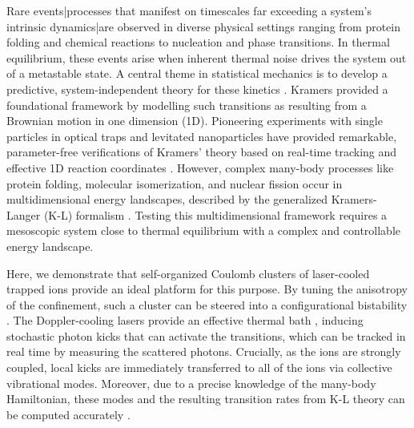 \documentclass[aps,prl,twocolumn,superscriptaddress,showpacs,floatfix]{revtex4-2}
\begin{document}
\maketitle

Rare events|processes that manifest on timescales far exceeding a system's intrinsic dynamics|are observed in diverse physical settings ranging from protein folding and chemical reactions to nucleation and phase transitions. In thermal equilibrium, these events arise when inherent thermal noise drives the system out of a metastable state. A central theme in statistical mechanics is to develop a predictive, system-independent theory for these kinetics \cite{Peters2017}. Kramers provided a foundational framework \cite{Kramers1940, Kramers_review_hanggi} by modelling such transitions as resulting from a Brownian motion in one dimension (1D). Pioneering experiments with single particles in optical traps \cite{McCann1999} and levitated nanoparticles \cite{Rondin2017} have provided remarkable, parameter-free verifications of Kramers' theory based on real-time tracking \cite{Li2010} and effective 1D reaction coordinates \cite{Berezhkovskii2005, Zijlstra2020}. However, complex many-body processes like protein folding, molecular isomerization, and nuclear fission occur in multidimensional energy landscapes, described by the generalized Kramers-Langer (K-L) formalism \cite{Langer1969}. Testing this multidimensional framework requires a mesoscopic system close to thermal equilibrium with a complex and controllable energy landscape.

Here, we demonstrate that self-organized Coulomb clusters of laser-cooled trapped ions provide an ideal platform for this purpose. By tuning the anisotropy of the confinement, such a cluster can be steered into a configurational bistability \cite{ayyadevara2025, mizukami2025}. The Doppler-cooling lasers provide an effective thermal bath \cite{Javanainen_1980, Javanainen_1986, Morigi_2001}, inducing stochastic photon kicks that can activate the transitions, which can be tracked in real time by measuring the scattered photons. Crucially, as the ions are strongly coupled, local kicks are immediately transferred to all of the ions via collective vibrational modes. Moreover, due to a precise knowledge of the many-body Hamiltonian, these modes and the resulting transition rates from K-L theory can be computed accurately \cite{Landa_2012, Kaufmann_2012, Kiethe_2021, ayyadevara2025}.
\end{document}
